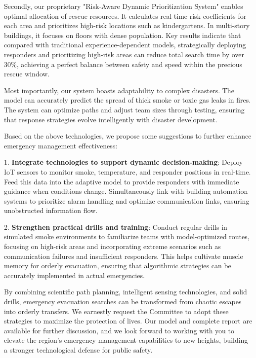 Secondly, our proprietary "Risk-Aware Dynamic Prioritization System" enables optimal allocation of rescue resources. It calculates real-time risk coefficients for each area and prioritizes high-risk locations such as kindergartens. In multi-story buildings, it focuses on floors with dense population. Key results indicate that compared with traditional experience-dependent models, strategically deploying responders and prioritizing high-risk areas can reduce total search time by over 30\%, achieving a perfect balance between safety and speed within the precious rescue window.

Most importantly, our system boasts adaptability to complex disasters. The model can accurately predict the spread of thick smoke or toxic gas leaks in fires. The system can optimize paths and adjust team sizes through testing, ensuring that response strategies evolve intelligently with disaster development.

Based on the above technologies, we propose some suggestions to further enhance emergency management effectiveness:


1. \textbf{Integrate technologies to support dynamic decision-making}: Deploy IoT sensors to monitor smoke, temperature, and responder positions in real-time. Feed this data into the adaptive model to provide responders with immediate guidance when conditions change. Simultaneously link with building automation systems to prioritize alarm handling and optimize communication links, ensuring unobstructed information flow.

2. \textbf{Strengthen practical drills and training}: Conduct regular drills in simulated smoke environments to familiarize teams with model-optimized routes, focusing on high-risk areas and incorporating extreme scenarios such as communication failures and insufficient responders. This helps cultivate muscle memory for orderly evacuation, ensuring that algorithmic strategies can be accurately implemented in actual emergencies.

By combining scientific path planning, intelligent sensing technologies, and solid drills, emergency evacuation searches can be transformed from chaotic escapes into orderly transfers. We earnestly request the Committee to adopt these strategies to maximize the protection of lives. Our model and complete report are available for further discussion, and we look forward to working with you to elevate the region’s emergency management capabilities to new heights, building a stronger technological defense for public safety.




